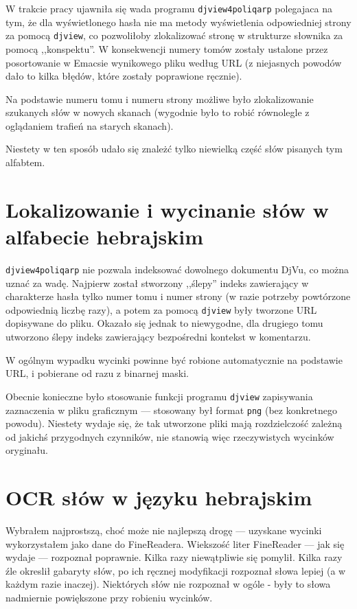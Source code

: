 \documentclass[12]{mwart}
\begin{document}
W trakcie pracy ujawniła się wada programu \texttt{djview4poliqarp}
polegajaca na tym, że dla wyświetlonego hasła nie ma metody
wyświetlenia odpowiedniej strony za pomocą \texttt{djview}, co
pozwoliłoby zlokalizować stronę w strukturze słownika za pomocą
,,konspektu''. W konsekwencji numery tomów zostały ustalone przez
posortowanie w Emacsie wynikowego pliku według URL (z niejasnych
powodów dało to kilka błędów, które zostały poprawione ręcznie).

Na podstawie numeru tomu i numeru strony możliwe było zlokalizowanie
szukanych słów w nowych skanach (wygodnie było to robić równolegle z
oglądaniem trafień na starych skanach).

Niestety w ten sposób udało się znależć tylko niewielką część słów
pisanych tym alfabtem.

\section{Lokalizowanie i wycinanie słów w alfabecie hebrajskim}
\label{sec:lokal-i-wycin}

\texttt{djview4poliqarp} nie pozwala indeksować dowolnego dokumentu
DjVu, co można uznać za wadę. Najpierw został stworzony ,,ślepy''
indeks zawierający w charakterze hasła tylko numer tomu i numer strony
(w razie potrzeby powtórzone odpowiednią liczbę razy), a potem za
pomocą \texttt{djview} były tworzone URL dopisywane do pliku. Okazało
się jednak to niewygodne, dla drugiego tomu utworzono ślepy indeks
zawierający bezpośredni kontekst w komentarzu.

W ogólnym wypadku wycinki powinne być robione automatycznie na
podstawie URL, i pobierane od razu z binarnej maski. 

Obecnie konieczne było stosowanie funkcji programu \texttt{djview}
zapisywania zaznaczenia w pliku graficznym --- stosowany był format
\texttt{png} (bez konkretnego powodu). Niestety wydaje się, że tak
utworzone pliki mają rozdzielczość zależną od jakichś przygodnych
czynników, nie stanowią więc rzeczywistych wycinków oryginału.

\section{OCR słów w języku hebrajskim}
\label{sec:ocr-sow-w}

Wybrałem najprostszą, choć może nie najlepszą drogę --- uzyskane
wycinki wykorzystałem jako dane do FineReadera. Wiekszość liter
FineReader --- jak się wydaje --- rozpoznał poprawnie. Kilka razy
niewątpliwie się pomylił. Kilka razy źle okreslił gabaryty słów, po
ich ręcznej modyfikacji rozpoznał słowa lepiej (a w każdym razie
inaczej). Niektórych słów nie rozpoznał w ogóle - były to słowa
nadmiernie powiększone przy robieniu wycinków.
\end{document}
